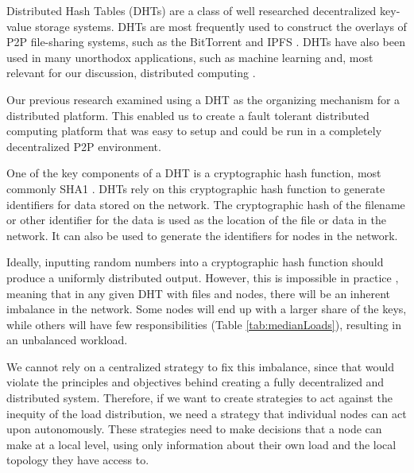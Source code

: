 \documentclass[10pt,conference]{IEEEtran}
\begin{document}

Distributed Hash Tables (DHTs) are a class of well researched decentralized key-value storage systems.
DHTs are most frequently used to construct the overlays of P2P file-sharing systems, such as the BitTorrent \cite{bittorrent} and IPFS \cite{benet2014ipfs}.
DHTs have also been used in many unorthodox applications, such as machine learning \cite{liparameter} and, most relevant for our discussion, distributed computing  \cite{marozzo2012p2p} \cite{leemap}.

Our previous research \cite{chordreduce} examined using a DHT as the organizing mechanism for a distributed platform.
This enabled us to create a fault tolerant distributed computing platform that was easy to setup and could be run in a completely decentralized P2P environment.

One of the key components of a DHT is a cryptographic hash function, most commonly SHA1 \cite{sha1}.
DHTs rely on this cryptographic hash function to generate identifiers for data stored on the network.
The cryptographic hash of the filename or other identifier for the data is used as the location of the file or data in the network.
It can also be used to generate the identifiers for nodes in the network.

Ideally, inputting random numbers into a cryptographic hash function should produce a uniformly distributed output.
However, this is impossible in practice \cite{hash-outputs} \cite{thomsen2005cryptographic}, meaning that in any given DHT with files and nodes, there will be an inherent imbalance in the network.
Some nodes will end up with a larger share of the keys, while others will have few responsibilities (Table \ref{tab:medianLoads}), resulting in an unbalanced workload.

We cannot rely on a centralized strategy to fix this imbalance, since that would violate the principles and objectives behind creating a fully decentralized and distributed system.
Therefore, if we want to create strategies to act against the inequity of the load distribution, we need a strategy that individual nodes can act upon autonomously.
These strategies need to make decisions that a node can make at a local level, using only information about their own load and the local topology they have access to.
\end{document}
